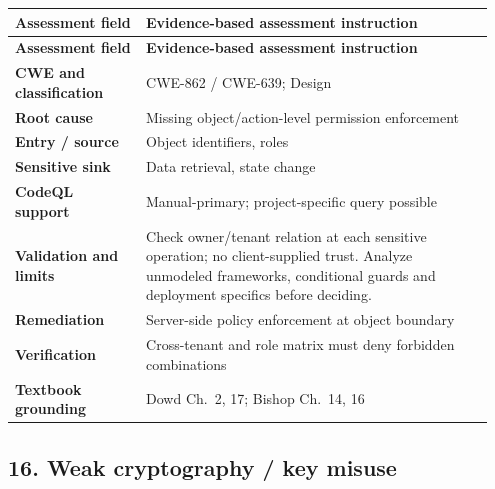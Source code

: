 \documentclass[11pt,letterpaper,oneside]{book}
\begin{document}
\small
\setlength{\tabcolsep}{2pt}
\renewcommand{\arraystretch}{1.18}
\begin{longtable}{>{\raggedright\arraybackslash}p{0.26\linewidth}>{\raggedright\arraybackslash}p{0.69\linewidth}}
\toprule
\textbf{Assessment field} & \textbf{Evidence-based assessment instruction}\\
\midrule
\endfirsthead
\toprule
\textbf{Assessment field} & \textbf{Evidence-based assessment instruction}\\
\midrule
\endhead
\textbf{CWE and classification} & CWE-862 / CWE-639; Design\\
\textbf{Root cause} & Missing object/action-level permission enforcement\\
\textbf{Entry / source} & Object identifiers, roles\\
\textbf{Sensitive sink} & Data retrieval, state change\\
\textbf{CodeQL support} & Manual-primary; project-specific query possible\\
\textbf{Validation and limits} & Check owner/tenant relation at each sensitive operation; no client-supplied trust. Analyze unmodeled frameworks, conditional guards and deployment specifics before deciding.\\
\textbf{Remediation} & Server-side policy enforcement at object boundary\\
\textbf{Verification} & Cross-tenant and role matrix must deny forbidden combinations\\
\textbf{Textbook grounding} & Dowd Ch.~2, 17; Bishop Ch.~14, 16\\
\bottomrule
\end{longtable}
\normalsize

\subsection{16. Weak cryptography / key misuse}
\end{document}
